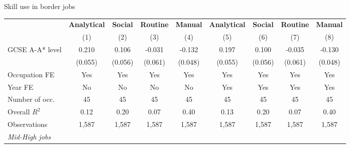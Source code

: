 \begin{landscape}
\begin{center}
\begin{threeparttable}[!h]
\caption{Skill use in border jobs}
\label{tab:skillRegs}
\begin{tabular}{lcccccccc}
\toprule
\toprule
&\multicolumn{1}{c}{\textbf{Analytical}}&\multicolumn{1}{c}{\textbf{Social}}&\multicolumn{1}{c}{\textbf{Routine}}&\multicolumn{1}{c}{\textbf{Manual}}&\multicolumn{1}{c}{\textbf{Analytical}}&\multicolumn{1}{c}{\textbf{Social}}&\multicolumn{1}{c}{\textbf{Routine}}&\multicolumn{1}{c}{\textbf{Manual}} \\
\textbf{}&\multicolumn{1}{c}{(1)}&\multicolumn{1}{c}{(2)}&\multicolumn{1}{c}{(3)}&\multicolumn{1}{c}{(4)}&\multicolumn{1}{c}{(5)}&\multicolumn{1}{c}{(6)}&\multicolumn{1}{c}{(7)}&\multicolumn{1}{c}{(8)} \\
\midrule
GCSE A-A* level     &       0.210\sym{***}&       0.106         &      -0.031         &      -0.132\sym{**} &       0.197\sym{***}&       0.100         &      -0.035         &      -0.130\sym{**} \\
                    &     (0.055)         &     (0.056)         &     (0.061)         &     (0.048)         &     (0.055)         &     (0.056)         &     (0.061)         &     (0.048)         \\
Occupation FE       &         Yes         &         Yes         &         Yes         &         Yes         &         Yes         &         Yes         &         Yes         &         Yes         \\
Year FE             &          No         &          No         &          No         &          No         &         Yes         &         Yes         &         Yes         &         Yes         \\
\midrule Number of occ.&          45         &          45         &          45         &          45         &          45         &          45         &          45         &          45         \\
Overall $ R^2$      &        0.12         &        0.20         &        0.07         &        0.40         &        0.13         &        0.20         &        0.07         &        0.40         \\
Observations        &       1,587         &       1,587         &       1,587         &       1,587         &       1,587         &       1,587         &       1,587         &       1,587         \\
\midrule \textit{Mid-High jobs} \\

\end{tabular}
\end{threeparttable}
\end{center}
\end{landscape}
